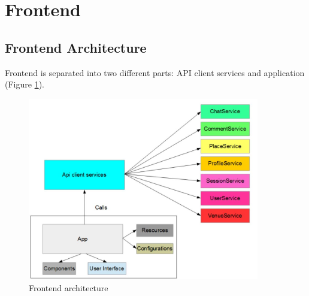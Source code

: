\section{Frontend}
\label{sec:frontend}
\subsection{Frontend Architecture}
Frontend is separated into two different parts: API client services and application (Figure \ref{fig:frontend_architecture}).
\begin{figure}[htbp]
	\includegraphics[width=0.9\textwidth]{images/frontend_architecture.jpg}
	\centering
	\caption{Frontend architecture}\label{fig:frontend_architecture}
\end{figure}
